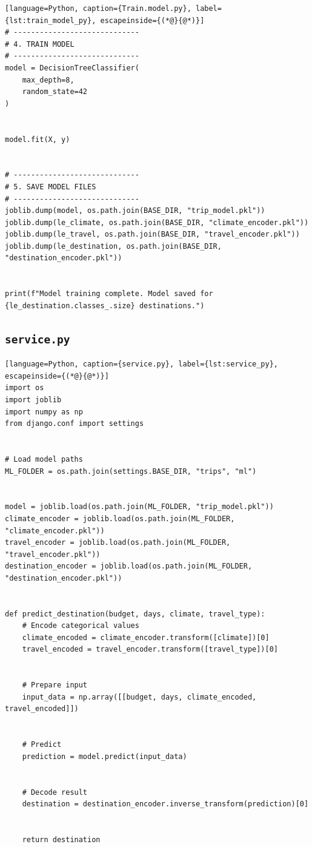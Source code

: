 \begin{lstlisting}[language=Python, caption={Train.model.py}, label={lst:train_model_py}, escapeinside={(*@}{@*)}]
# -----------------------------
# 4. TRAIN MODEL
# -----------------------------
model = DecisionTreeClassifier(
    max_depth=8,
    random_state=42
)


model.fit(X, y)


# -----------------------------
# 5. SAVE MODEL FILES
# -----------------------------
joblib.dump(model, os.path.join(BASE_DIR, "trip_model.pkl"))
joblib.dump(le_climate, os.path.join(BASE_DIR, "climate_encoder.pkl"))
joblib.dump(le_travel, os.path.join(BASE_DIR, "travel_encoder.pkl"))
joblib.dump(le_destination, os.path.join(BASE_DIR, "destination_encoder.pkl"))


print(f"Model training complete. Model saved for {le_destination.classes_.size} destinations.")
\end{lstlisting}


\subsection{\texttt{service.py}}
\begin{lstlisting}[language=Python, caption={service.py}, label={lst:service_py}, escapeinside={(*@}{@*)}]
import os
import joblib
import numpy as np
from django.conf import settings


# Load model paths
ML_FOLDER = os.path.join(settings.BASE_DIR, "trips", "ml")


model = joblib.load(os.path.join(ML_FOLDER, "trip_model.pkl"))
climate_encoder = joblib.load(os.path.join(ML_FOLDER, "climate_encoder.pkl"))
travel_encoder = joblib.load(os.path.join(ML_FOLDER, "travel_encoder.pkl"))
destination_encoder = joblib.load(os.path.join(ML_FOLDER, "destination_encoder.pkl"))


def predict_destination(budget, days, climate, travel_type):
    # Encode categorical values
    climate_encoded = climate_encoder.transform([climate])[0]
    travel_encoded = travel_encoder.transform([travel_type])[0]


    # Prepare input
    input_data = np.array([[budget, days, climate_encoded, travel_encoded]])


    # Predict
    prediction = model.predict(input_data)


    # Decode result
    destination = destination_encoder.inverse_transform(prediction)[0]


    return destination
\end{lstlisting}


